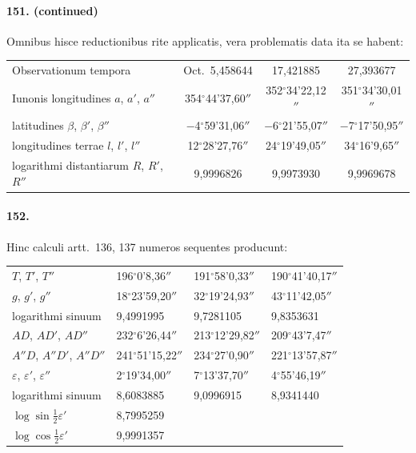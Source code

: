 \documentclass[12pt,a4paper]{article}
\begin{document}
\paragraph{151. (continued)}
Omnibus hisce reductionibus rite applicatis, vera problematis data ita se habent:

\begin{center}
\begin{tabular}{lccc}
\toprule
Observationum tempora & Oct.\ 5,458644 & 17,421885 & 27,393677\\
Iunonis longitudines $a$, $a'$, $a''$ & 354$^\circ$44'37,60$''$ & 352$^\circ$34'22,12$''$ & 351$^\circ$34'30,01$''$\\
latitudines $\beta$, $\beta'$, $\beta''$ & $-$4$^\circ$59'31,06$''$ & $-$6$^\circ$21'55,07$''$ & $-$7$^\circ$17'50,95$''$\\
longitudines terrae $l$, $l'$, $l''$ & 12$^\circ$28'27,76$''$ & 24$^\circ$19'49,05$''$ & 34$^\circ$16'9,65$''$\\
logarithmi distantiarum $R$, $R'$, $R''$ & 9,9996826 & 9,9973930 & 9,9969678\\
\bottomrule
\end{tabular}
\end{center}

\paragraph{152.}
Hinc calculi artt.~136, 137 numeros sequentes producunt:

\begin{center}
\begin{tabular}{llll}
\toprule
$T$, $T'$, $T''$ & 196$^\circ$0'8,36$''$ & 191$^\circ$58'0,33$''$ & 190$^\circ$41'40,17$''$\\
$g$, $g'$, $g''$ & 18$^\circ$23'59,20$''$ & 32$^\circ$19'24,93$''$ & 43$^\circ$11'42,05$''$\\
logarithmi sinuum & 9,4991995 & 9,7281105 & 9,8353631\\
$AD$, $AD'$, $AD''$ & 232$^\circ$6'26,44$''$ & 213$^\circ$12'29,82$''$ & 209$^\circ$43'7,47$''$\\
$A''D$, $A''D'$, $A''D''$ & 241$^\circ$51'15,22$''$ & 234$^\circ$27'0,90$''$ & 221$^\circ$13'57,87$''$\\
$\varepsilon$, $\varepsilon'$, $\varepsilon''$ & 2$^\circ$19'34,00$''$ & 7$^\circ$13'37,70$''$ & 4$^\circ$55'46,19$''$\\
logarithmi sinuum & 8,6083885 & 9,0996915 & 8,9341440\\
$\log\sin\tfrac{1}{2}\varepsilon'$ & 8,7995259 & &\\
$\log\cos\tfrac{1}{2}\varepsilon'$ & 9,9991357 & &\\
\bottomrule
\end{tabular}
\end{center}
\end{document}
